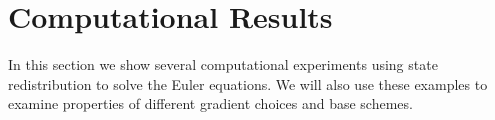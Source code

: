 \section{Computational Results}\label{sec:compResults}
In this section we show several computational experiments using state
redistribution to solve the Euler
equations. We will also use these
examples to examine 
properties of different gradient choices and base schemes. 

%
